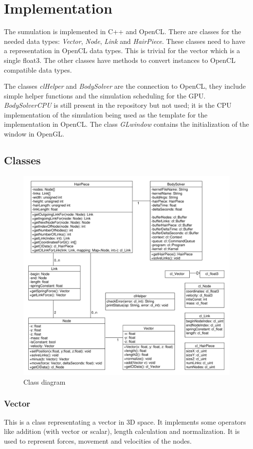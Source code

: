 \documentclass[11pt,a4paper]{scrartcl}
\begin{document}
\section{Implementation}
The sumulation is implemented in C++ and OpenCL. There are classes for the needed data types: \textit{Vector}, \textit{Node}, \textit{Link} and \textit{HairPiece}. These classes need to have a representation in OpenCL data types. This is trivial for the vector which is a single float3. The other classes have methods to convert instances to OpenCL compatible data types.

The classes \textit{clHelper} and \textit{BodySolver} are the connection to OpenCL, they include simple helper functions and the simulation scheduling for the GPU. \textit{BodySolverCPU} is still present in the repository but not used; it is the CPU implementation of the simulation being used as the template for the implementation in OpenCL. The class \textit{GLwindow} contains the initialization of the window in OpenGL.

\subsection{Classes}
\begin{figure}[!h]
\centering
\includegraphics[width=0.8\linewidth]{Classes.pdf}
\caption{Class diagram}
\end{figure}

\subsubsection{Vector}
This is a class representating a vector in 3D space. It implements some operators like addition (with vector or scalar), length calculation and normalization.
It is used to represent forces, movement and velocities of the nodes.
\end{document}
